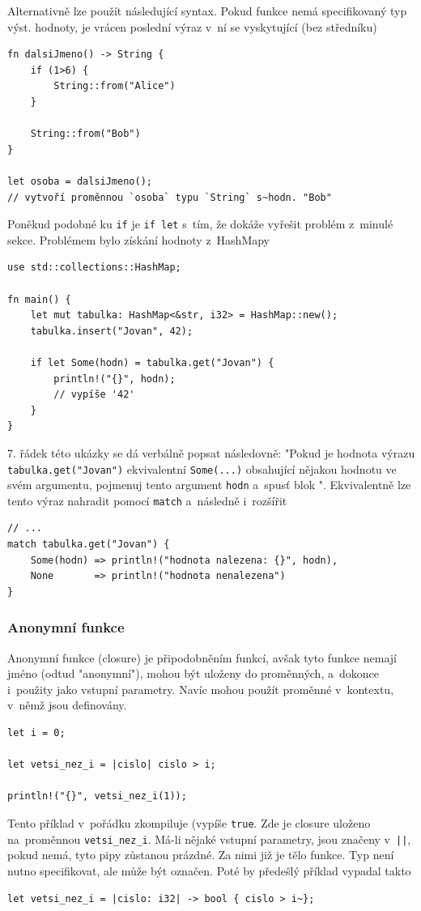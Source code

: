 \documentclass[a4paper, 12pt, twoside]{article} %
\newcommand{\rust}[1]{\texttt{#1}}
\begin{document}
		Alternativně lze použít následující syntax. Pokud funkce nemá specifikovaný typ výst. hodnoty, je vrácen poslední výraz v~ní se vyskytující (bez středníku)
		\begin{verbatim}
fn dalsiJmeno() -> String {
	if (1>6) {
		String::from("Alice")
	}

	String::from("Bob")
}

let osoba = dalsiJmeno();
// vytvoří proměnnou `osoba` typu `String` s~hodn. "Bob"
		\end{verbatim}
		
		Poněkud podobné ku \rust{if} je \rust{if let} s~tím, že dokáže vyřešit problém z~minulé sekce. Problémem bylo získání hodnoty z~HashMapy
		\begin{verbatim}
use std::collections::HashMap;

fn main() {
	let mut tabulka: HashMap<&str, i32> = HashMap::new();
	tabulka.insert("Jovan", 42); 
	
	if let Some(hodn) = tabulka.get("Jovan") {
		println!("{}", hodn);
		// vypíše '42'
	}
}
		\end{verbatim}
		
		7. řádek této ukázky se dá verbálně popsat následovně: "Pokud je hodnota výrazu \rust{tabulka.get("Jovan")} ekvivalentní \rust{Some(...)} obsahující nějakou hodnotu ve svém argumentu, pojmenuj tento argument \texttt{hodn} a~spusť blok \texttt{\string{\dots\string}}". Ekvivalentně lze tento výraz nahradit pomocí \rust{match} a~následně i~rozšířit
		\begin{verbatim}
// ...
match tabulka.get("Jovan") {
	Some(hodn) => println!("hodnota nalezena: {}", hodn),
	None       => println!("hodnota nenalezena")
}
		\end{verbatim}
		
		\subsubsection*{Anonymní funkce}
			Anonymní funkce (closure) je připodobněním funkcí, avšak tyto funkce nemají jméno (odtud "anonymní"), mohou být uloženy do proměnných, a~dokonce i~použity jako vstupní parametry. Navíc mohou použít proměnné v~kontextu, v~němž jsou definovány.
			\begin{verbatim}
let i = 0;

let vetsi_nez_i = |cislo| cislo > i;

println!("{}", vetsi_nez_i(1));
			\end{verbatim}
			
			Tento příklad v~pořádku zkompiluje (vypíše \texttt{true}. Zde je closure uloženo na~proměnnou \rust{vetsi_nez_i}. Má-li nějaké vstupní parametry, jsou značeny v~\rust{||}, pokud nemá, tyto pipy zůstanou prázdné. Za nimi již je tělo funkce. Typ není nutno specifikovat, ale může být označen. Poté by předešlý příklad vypadal takto
			\begin{verbatim}
let vetsi_nez_i = |cislo: i32| -> bool { cislo > i~};
			\end{verbatim}
			
\end{document}
